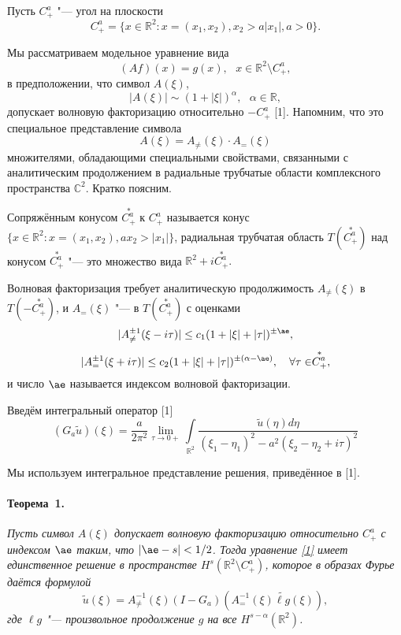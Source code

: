
\vzmscaption



Пусть $C^a_+$ "--- угол на плоскости
\[
C^a_+=\{x\in\mathbb R^2: x=(x_1,x_2), x_2>a|x_1|, a>0\}.
\]

Мы рассматриваем модельное уравнение вида
\begin{equation}\label{1}
(Af)(x)=g(x),~~~x\in\mathbb R^{2}\setminus C^a_+,
\end{equation}
в предположении, что символ $A(\xi)$,
 \[
 |A(\xi)|\sim(1+|\xi|)^{\alpha},~~~\alpha\in\mathbb R,
 \]
 допускает волновую факторизацию относительно $-C^a_+$ [1].  Напомним, что это специальное представление символа
\[
A(\xi)=A_{\neq}(\xi)\cdot A_=(\xi)
\]
 множителями, обладающими специальными свойствами, связанными с аналитическим продолжением в радиальные трубчатые области комплексного пространства  $\mathbb C^2$. Кратко поясним.

 Сопряжённым конусом $\stackrel{*}{C^a_+}$ к $C^a_+$  называется конус $\{x\in\mathbb R^2: x=(x_1,x_2), ax_2>|x_1|\}$, радиальная трубчатая область $T(\stackrel{*}{C^a_+})$ над конусом $\stackrel{*}{C^a_+}$ "--- это множество вида $\mathbb R^2+i\stackrel{*}{C^a_+}.$

 Волновая факторизация требует аналитическую продолжимость $A_{\neq}(\xi)$ в $T(-\stackrel{*}{C^a_+})$, и $A_=(\xi)$ "--- в $T(\stackrel{*}{C^a_+})$ с оценками
 \[
 |A^{\pm 1}_{\neq}(\xi-i\tau)|\leq c_1(1+|\xi|+|\tau|)^{\pm\ae},
 \]
 \[
 |A^{\pm 1}_=(\xi+i\tau)|\leq c_2(1+|\xi|+|\tau|)^{\pm(\alpha-\ae)},~~~\forall\tau\in\stackrel{*}{C^a_+},
 \]
и число $\ae$ называется индексом волновой факторизации.

Введём интегральный оператор [1]
\[
(G_a\tilde u)(\xi)=\frac{a}{2\pi^2}\lim\limits_{\tau\to 0+}\int\limits_{\mathbb R^2}\frac{\tilde u(\eta)d\eta}{(\xi_1-\eta_1)^2-a^2(\xi_2-\eta_2+i\tau)^2}
\]

Мы используем интегральное представление решения, приведённое в [1].

\paragraph{Теорема~1.} {\it
 Пусть символ $A(\xi)$ допускает волновую факторизацию относительно $C^a_+$ с индексом $\ae$ таким, что $|\ae-s|<1/2$. Тогда уравнение \eqref{1} имеет единственное решение в пространстве  $H^s(\mathbb R^2\setminus C^a_+)$, которое в образах Фурье даётся формулой
 \[
 \tilde u(\xi)=A^{-1}_{\neq}(\xi)(I-G_a)(A^{-1}_=(\xi)\widetilde{\ell g}(\xi)),
 \]
где $\ell g$ "--- произвольное продолжение $g$ на все $H^{s-\alpha}(\mathbb R^2)$.
}

